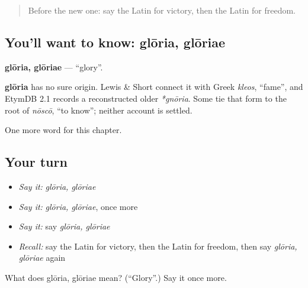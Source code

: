 \label{lesson:LA-C187-gloria}



\begin{quote}
Before the new one: say the Latin for victory, then the Latin for freedom.
\end{quote}

\subsection*{You'll want to know: glōria, glōriae}
\textbf{glōria, glōriae} — \textquotedblleft{}glory\textquotedblright{}.

\begin{cousinweb}
\textbf{glōria} has no sure origin. Lewis \& Short connect it with Greek \emph{kleos}, \textquotedblleft{}fame\textquotedblright{}, and EtymDB 2.1 records a reconstructed older \emph{*gnōria}. Some tie that form to the root of \emph{nōscō}, \textquotedblleft{}to know\textquotedblright{}; neither account is settled.
\end{cousinweb}

\begin{grammarlens}[title={What you've built}]
One more word for this chapter.
\end{grammarlens}

\subsection*{Your turn}
\begin{itemize}
\raggedright
  \item \emph{Say it:} \emph{glōria, glōriae}
  \item \emph{Say it:} \emph{glōria, glōriae}, once more
  \item \emph{Say it:} say \emph{glōria, glōriae}
  \item \emph{Recall:} say the Latin for victory, then the Latin for freedom, then say \emph{glōria, glōriae} again
\end{itemize}

\begin{tcolorbox}[breakable,colback=teal!4,colframe=teal!35!black,title={Before you move on}]
What does glōria, glōriae mean? (\textquotedblleft{}Glory\textquotedblright{}.) Say it once more.
\end{tcolorbox}
